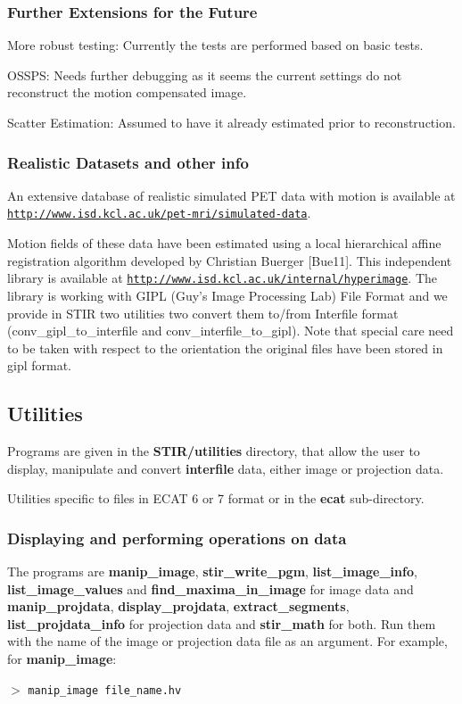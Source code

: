 \documentclass{article}
\def\R2Lurl#1#2{\mbox{\href{#1}{\tt #2}}}
\newcommand{\cmdline}[1]{\par \noindent $>$ \texttt{#1}\par}
\begin{document}
\subsubsection{Further Extensions for the Future}
More robust testing: Currently the tests are performed based on basic tests.

OSSPS: Needs further debugging as it seems the current settings do not reconstruct the
motion compensated image. 

Scatter Estimation: Assumed to have it already estimated prior to reconstruction. 

\subsubsection{Realistic Datasets and other info}
An extensive
database of realistic simulated PET data with motion is available at\\
\R2Lurl{http://www.isd.kcl.ac.uk/pet-mri/simulated-data/}{http://www.isd.kcl.ac.uk/pet-mri/simulated-data}. 

Motion fields of these data have been estimated using a local hierarchical affine
registration algorithm developed by Christian Buerger [Bue11]. This independent
library is available at
\R2Lurl{http://www.isd.kcl.ac.uk/internal/hyperimage}{http://www.isd.kcl.ac.uk/internal/hyperimage}. 
The library is working with GIPL (Guy's Image Processing Lab) File Format and we provide in STIR two utilities two convert
them to/from Interfile format (conv\_gipl\_to\_interfile and
conv\_interfile\_to\_gipl). Note that special care need to be taken with respect
to the orientation the original files have been stored in gipl format. 


\subsection{
Utilities}

Programs are given in the \textbf{STIR/utilities} directory, that 
allow the user to display, manipulate and convert \textbf{interfile} 
data, either image or projection data.

Utilities specific to files in ECAT 6 or 7 format or in the \textbf{ecat}
sub-directory.

\subsubsection{
Displaying and performing operations on data}

The programs are \textbf{manip\_image}, \textbf{stir\_write\_pgm}, \textbf{list\_image\_info}, 
\textbf{list\_image\_values} and \textbf{find\_maxima\_in\_image}
for image data and \textbf{manip\_projdata}, 
 \textbf{display\_projdata}, \textbf{extract\_segments}, 
\textbf{list\_projdata\_info} for 
projection data and \textbf{stir\_math} for both. Run them with the 
name of the image or projection data file as an argument. For 
example, for \textbf{manip\_image}:
\cmdline{manip\_image file\_name.hv}
\end{document}
